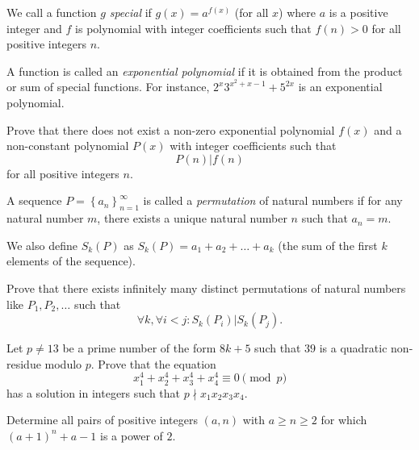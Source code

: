 \documentclass[problems.tex]{subfile}
\begin{document}
	
	\begin{problem}
		We call a function $g$ \textit{special} if $g(x)=a^{f(x)}$ (for all $x$) where $a$ is a positive integer and $f$ is polynomial with integer coefficients such that $f(n)>0$ for all positive integers $n$.
		
		A function is called an \textit{exponential polynomial} if it is obtained from the product or sum of special functions. For instance, $2^{x}3^{x^{2}+x-1}+5^{2x}$ is an exponential polynomial.
		
		Prove that there does not exist a non-zero exponential polynomial $f(x)$ and a non-constant polynomial $P(x)$ with integer coefficients such that
		$$P(n)|f(n)$$for all positive integers $n$. %
	\end{problem}
	
	
	
	
	\begin{problem}
		A sequence $P=\left \{ a_{n} \right \}_{n=1}^{\infty}$ is called a \textit{permutation} of natural numbers if for any natural number $m$, there exists a unique natural number $n$ such that $a_n=m.$
		
		We also define $S_k(P)$ as
		$S_k(P)=a_{1}+a_{2}+\dots +a_{k}$ (the sum of the first $k$ elements of the sequence).
		
		Prove that there exists infinitely many distinct permutations of natural numbers like $P_1,P_2, \dots$ such that
		$$\forall k, \forall i<j: S_k(P_i)|S_k(P_j).$$
	\end{problem}
	
	
	
	
	\begin{problem}
		Let $p \neq 13$ be a prime number of the form $8k+5$ such that $39$ is a quadratic non-residue modulo $p$. Prove that the equation $$x_1^4+x_2^4+x_3^4+x_4^4 \equiv 0 \pmod p$$ has a solution in integers such that $p\nmid x_1x_2x_3x_4$. %
	\end{problem}
	
	
	
	
	\begin{problem}
		Determine all pairs of positive integers $(a,n)$ with $a\ge n\ge 2$ for which $(a+1)^n+a-1$ is a power of $2$. %
	\end{problem}
	
\end{document}
